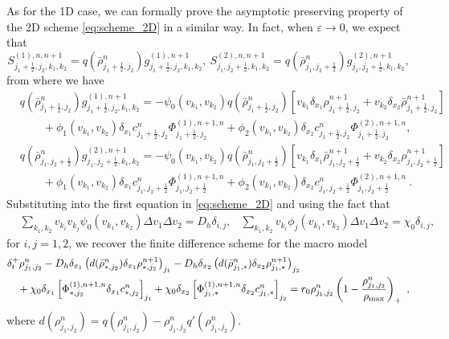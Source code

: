 \documentclass{article}
\begin{document}
{As for the 1D case, we can formally prove the asymptotic preserving property of the 2D scheme \eqref{eq:scheme_2D} in a similar way. 
In fact, when $\varepsilon\to 0$, we expect that  
\begin{equation*}
	S_{j_1+\frac12, j_2, k_1, k_2}^{(1), n, n+1} = q( {\bar{\rho}}_{j_1+\frac12,j_2}^n) g_{j_1+\frac12,j_2,k_1,k_2}^{(1), n+1}, \  S_{j_1, j_2+\frac12, k_1, k_2}^{(2), n, n+1} = q( {\bar{\rho}}_{j_1,j_2+\frac12}^n) g_{j_1,j_2+\frac12,k_1,k_2}^{(2), n+1},
\end{equation*}
from where we have
\begin{align*}
  & q( {\bar{\rho}}_{j_1+\frac12,j_2}^n) g_{j_1+\frac12,j_2,k_1,k_2}^{(1), n+1} = -\psi_{0}(v_{k_1}, v_{k_2})q( \bar{\rho}_{j_1+\frac12,j_2}^n)  \left[v_{k_1} \delta_{x_1} \rho_{j_1+\frac12, j_2}^{n+1} + v_{k_2} \delta_{x_2} \bar{\rho}_{j_1+\frac12, j_2}^{n+1} \right] \nonumber \\
        & \qquad  + \phi_{1}(v_{k_1}, v_{k_2})\delta_{x_1} c_{j_1+\frac12,j_2}^n \Phi^{(1),n+1,n}_{j_1+\frac12,j_2}+\phi_{2}(v_{k_1}, v_{k_2}) \delta_{x_2} c_{j_1+\frac12,j_2}^n
        \Phi^{(2),n+1,n}_{j_1+\frac12,j_2},\\
	&q( \bar{\rho}_{j_1,j_2+\frac12}^n) g_{j_1,j_2+\frac12,k_1,k_2}^{(2), n+1} = -\psi_{0}(v_{k_1}, v_{k_2})q( \bar{\rho}_{j_1,j_2+\frac12}^n)  \left[v_{k_1} \delta_{x_1} \bar{\rho}_{j_1, j_2+\frac12}^{n+1} + v_{k_2} \delta_{x_2} \rho_{j_1, j_2+\frac12}^{n+1} \right] \nonumber\\
    & \qquad  + \phi_{1}(v_{k_1}, v_{k_2})\delta_{x_1} c_{j_1,j_2+\frac12}^n\Phi^{(1),n+1,n}_{j_1,j_2+\frac12} +\phi_{2}(v_{k_1}, v_{k_2}) \delta_{x_2} c_{j_1,j_2+\frac12}^n 
    \Phi^{(2),n+1,n}_{j_1,j_2+\frac12}\ .
\end{align*}
Substituting into the first equation in \eqref{eq:scheme_2D} and using the fact that
\begin{align*}
	&\sum_{k_1,k_2} v_{k_i}v_{k_j} \psi_0(v_{k_1},v_{k_2}) \Delta v_1 \Delta v_2 = D_h \delta_{i,j},  
	&\sum_{k_1,k_2} v_{k_i} \phi_j(v_{k_1},v_{k_2}) \Delta v_1 \Delta v_2 = \chi_0\delta_{i,j},                   
\end{align*}
for $i,j = 1,2$, 
we recover the finite difference scheme for the macro model 
\begin{align*}
	&\delta_t^+ \rho_{j_1,j_2}^n   
    	- D_h \delta_{x_1} \left( d(\bar{\rho}_{*,j_2}^n) \delta_{x_1} \rho_{*,j_2}^{n+1}\right)_{j_1} 
	- D_h \delta_{x_2} \left( d(\bar{\rho}_{j_1,*}^n)\delta_{x_2} \rho_{j_1, *}^{n+1} \right)_{j_2} 	\nonumber \\
	 & \quad + \chi_0\delta_{x_1}\left[\Phi_{*,j_2}^{(1),n+1,n}\delta_{x_1} c_{*,j_2}^n\right]_{j_1} 
	 + \chi_0\delta_{x_2}\left[\Phi_{j_1,*}^{(1),n+1,n}\delta_{x_2} c_{j_1,*}^n\right]_{j_2}
    = r_0 \rho_{j_1,j_2}^{n}\left(1 - \frac{\rho_{j_1,j_2}^n}{\rho_{\rm max}}\right)_+\ ,
\end{align*}
where $d(\rho_{j_1,j_2}^n) = q(\rho_{j_1,j_2}^n) - \rho_{j_1,j_2}^n q'( \rho_{j_1,j_2}^n)$.

}
\end{document}
